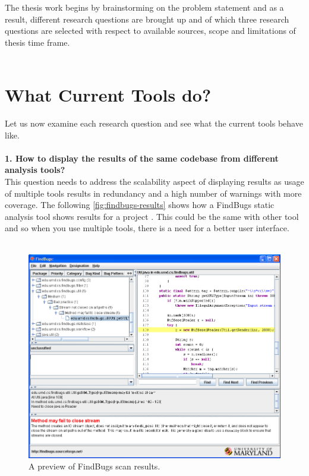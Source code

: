 The thesis work begins by brainstorming on the problem statement and as a result, different research questions are brought up and of which three research questions are selected with respect to available sources, scope and limitations of thesis time frame. \\ \\

\section{What Current Tools do?}

Let us now examine each research question and see what the current tools behave like. \\ \\

\textbf{1. How to display the results of the same codebase from different analysis tools?}  \\

This question needs to address the scalability aspect of displaying results as usage of multiple tools results in redundancy and a high number of warnings with more coverage. The following \autoref{fig:findbugs-results} shows how a FindBugs \cite{findbugs} static analysis tool shows results for a project \cite{findbugs-example}. This could be the same with other tool and so when you use multiple tools, there is a need for a better user interface.\\ \\

\begin{figure}[hbt!]
	\centering
	\includegraphics[width=\linewidth]{figures/findbugs-results}
	\caption{A preview of FindBugs scan results.}
	\label{fig:findbugs-results}
\end{figure}

